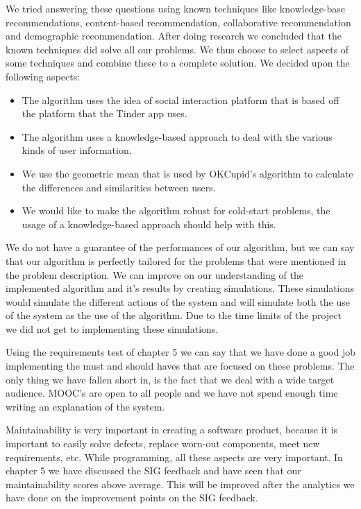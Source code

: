 We tried answering these questions using known techniques like knowledge-base recommendations, content-based recommendation, collaborative recommendation and demographic recommendation.
After doing research we concluded that the known techniques did solve all our problems.
We thus choose to select aspects of some techniques and combine these to a complete solution.
We decided upon the following aspects:
\begin{itemize}
\item The algorithm uses the idea of social interaction platform that is based off the platform that the Tinder app uses.
\item The algorithm uses a knowledge-based approach to deal with the various kinds of user information.
\item We use the geometric mean that is used by OKCupid's algorithm to calculate the differences and similarities between users.
\item We would like to make the algorithm robust for cold-start problems, the usage of a knowledge-based approach should help with this.
\end{itemize}

We do not have a guarantee of the performances of our algorithm, but we can say that our algorithm is perfectly tailored for the problems that were mentioned in the problem description.
We can improve on our understanding of the implemented algorithm and it's results by creating simulations.
These simulations would simulate the different actions of the system and will simulate both the use of the system as the use of the algorithm.
Due to the time limits of the project we did not get to implementing these simulations.

Using the requirements test of chapter 5 we can say that we have done a good job implementing the must and should haves that are focused on these problems.
The only thing we have fallen short in, is the fact that we deal with a wide target audience.
MOOC's are open to all people and we have not spend enough time writing an explanation of the system.

Maintainability is very important in creating a software product, because it is important to easily solve defects, replace worn-out components, meet new requirements, etc.
While programming, all these aspects are very important.
In chapter 5 we have discussed the SIG feedback and have seen that our maintainability scores above average.
This will be improved after the analytics we have done on the improvement points on the SIG feedback.

